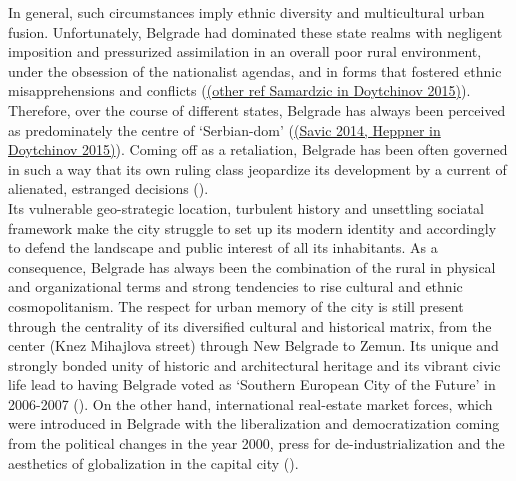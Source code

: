 \documentclass[11pt]{report}
\begin{document}
In general, such circumstances imply ethnic diversity and multicultural urban fusion.
Unfortunately, Belgrade had dominated these state realms with negligent imposition and pressurized  assimilation in an overall poor  rural  environment, under  the obsession of the nationalist agendas, and in forms  that  fostered ethnic misapprehensions  and  conflicts (\href{}{(other ref Samardzic in Doytchinov 2015)}).
Therefore, over the course of different states, Belgrade has always been perceived as predominately the centre of ‘Serbian-dom’ (\href{}{(Savic 2014, Heppner in Doytchinov 2015)}).
Coming off as a retaliation, Belgrade has been often governed in such a way that its own ruling class jeopardize its development by a current of alienated, estranged  decisions (\href{}{\citealt{doytchinov_belgrade_2015}}).
\\

Its vulnerable geo-strategic location, turbulent history and unsettling sociatal framework make the city struggle to set up its modern identity and accordingly to defend the landscape and public interest of all its inhabitants. As a consequence, Belgrade has always been the combination of the rural in physical and organizational terms and strong tendencies to rise cultural and ethnic cosmopolitanism.
The respect for urban memory of the city is still present through the centrality of its diversified cultural and historical matrix, from the center (Knez Mihajlova street) through New Belgrade to Zemun.
Its unique and strongly bonded unity of historic and architectural heritage and its vibrant civic life lead to having Belgrade voted as ‘Southern European City of the Future’ in 2006-2007 (\href{}{\citealt{hirt_belgrade_2009}}).
On the other hand, international real-estate market forces, which were introduced in Belgrade with the liberalization and democratization coming from the political changes in the year 2000, press for de-industrialization and the aesthetics of globalization in the capital city (\href{}{\citealt{grozdanic_belgrade_2008}}).
\\
\end{document}
